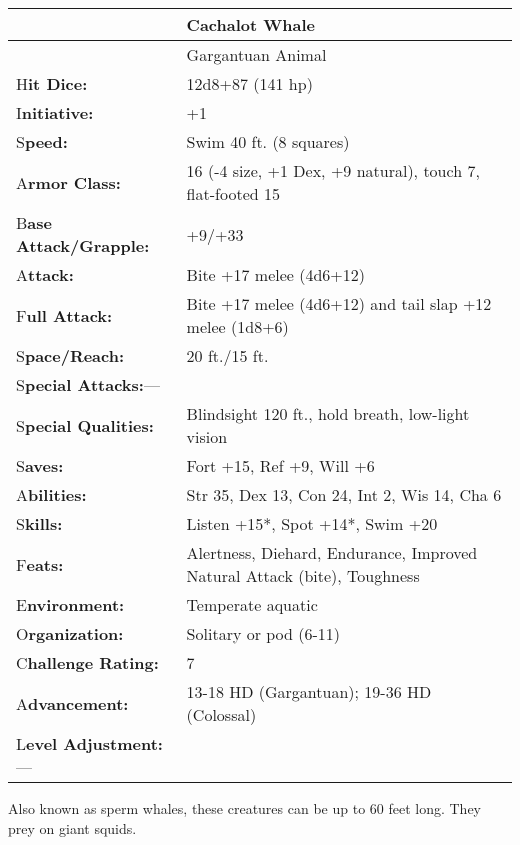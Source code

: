 \documentclass{article}
\begin{document}
\vspace{12pt}
\begin{tabular}{|>{\raggedright}p{77pt}|>{\raggedright}p{249pt}|}
\hline
 & Cachalot Whale\tabularnewline
\hline
 & Gargantuan Animal\tabularnewline
\hline
H\textbf{it Dice:} & 12d8+87 (141 hp)\tabularnewline
\hline
I\textbf{nitiative:} & +1\tabularnewline
\hline
S\textbf{peed:} & Swim 40 ft. (8 squares)\tabularnewline
\hline
A\textbf{rmor Class:} & 16 (-4 size, +1 Dex, +9 natural), touch 7, flat-footed 
15\tabularnewline
\hline
B\textbf{ase Attack/Grapple:} & +9/+33\tabularnewline
\hline
A\textbf{ttack:} & Bite +17 melee (4d6+12)\tabularnewline
\hline
F\textbf{ull Attack:} & Bite +17 melee (4d6+12) and tail slap +12 melee (1d8+6)\tabularnewline
\hline
S\textbf{pace/Reach:} & 20 ft./15 ft.\tabularnewline
\hline
S\textbf{pecial Attacks:}--- & \tabularnewline
\hline
S\textbf{pecial Qualities:} & Blindsight 120 ft., hold breath, low-light vision\tabularnewline
\hline
S\textbf{aves:} & Fort +15, Ref +9, Will +6\tabularnewline
\hline
A\textbf{bilities:} & Str 35, Dex 13, Con 24, Int 2, Wis 14, Cha 6\tabularnewline
\hline
S\textbf{kills:} & Listen +15*, Spot +14*, Swim +20\tabularnewline
\hline
F\textbf{eats:} & Alertness, Diehard, Endurance, Improved Natural Attack (bite), 
Toughness\tabularnewline
\hline
E\textbf{nvironment:} & Temperate aquatic\tabularnewline
\hline
O\textbf{rganization:} & Solitary or pod (6-11)\tabularnewline
\hline
C\textbf{hallenge Rating:} & 7\tabularnewline
\hline
A\textbf{dvancement:} & 13-18 HD (Gargantuan); 19-36 HD (Colossal)\tabularnewline
\hline
L\textbf{evel Adjustment:}--- & \tabularnewline
\hline
\end{tabular}

Also known as sperm whales, these creatures can be up to 60 feet long. They prey 
on giant squids.
\end{document}
